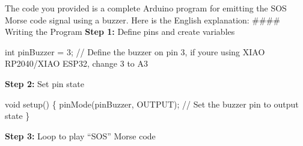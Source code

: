 \documentclass[
  letterpaper,
  DIV=11,
  numbers=noendperiod]{scrreprt}
\newenvironment{Shaded}{\begin{snugshade}}{\end{snugshade}}
\newcommand{\CommentTok}[1]{\textcolor[rgb]{0.37,0.37,0.37}{#1}}
\newcommand{\DataTypeTok}[1]{\textcolor[rgb]{0.68,0.00,0.00}{#1}}
\newcommand{\DecValTok}[1]{\textcolor[rgb]{0.68,0.00,0.00}{#1}}
\newcommand{\NormalTok}[1]{\textcolor[rgb]{0.00,0.23,0.31}{#1}}
\newcommand{\OperatorTok}[1]{\textcolor[rgb]{0.37,0.37,0.37}{#1}}
\begin{document}
The code you provided is a complete Arduino program for emitting the SOS
Morse code signal using a buzzer. Here is the English explanation:
\#\#\#\# Writing the Program \textbf{Step 1:} Define pins and create
variables

\begin{Shaded}
\begin{Highlighting}[]
\DataTypeTok{int}\NormalTok{ pinBuzzer }\OperatorTok{=} \DecValTok{3}\OperatorTok{;} \CommentTok{// Define the buzzer on pin 3, if you\textquotesingle{}re using XIAO RP2040/XIAO ESP32, change 3 to A3}
\end{Highlighting}
\end{Shaded}

\textbf{Step 2:} Set pin state

\begin{Shaded}
\begin{Highlighting}[]
\DataTypeTok{void}\NormalTok{ setup}\OperatorTok{()} \OperatorTok{\{}
\NormalTok{    pinMode}\OperatorTok{(}\NormalTok{pinBuzzer}\OperatorTok{,}\NormalTok{ OUTPUT}\OperatorTok{);} \CommentTok{// Set the buzzer pin to output state}
\OperatorTok{\}}
\end{Highlighting}
\end{Shaded}

\textbf{Step 3:} Loop to play ``SOS'' Morse code
\end{document}
